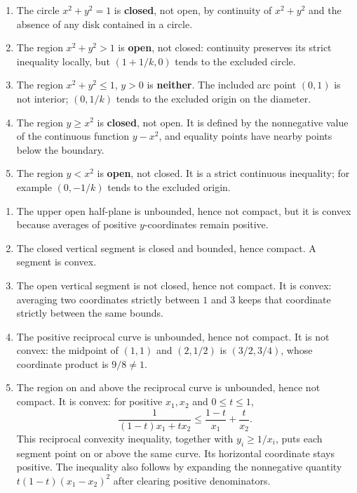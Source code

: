 \begin{enumerate}[label=(\alph*)]
\item The circle $x^2+y^2=1$ is \textbf{closed}, not open, by continuity
of $x^2+y^2$ and the absence of any disk contained in a circle.
\item The region $x^2+y^2>1$ is \textbf{open}, not closed: continuity
preserves its strict inequality locally, but $(1+1/k,0)$ tends to the excluded circle.
\item The region $x^2+y^2\le1$, $y>0$ is \textbf{neither}.
The included arc point $(0,1)$ is not interior; $(0,1/k)$ tends to the
excluded origin on the diameter.
\item The region $y\ge x^2$ is \textbf{closed}, not open. It is defined
by the nonnegative value of the continuous function $y-x^2$, and equality
points have nearby points below the boundary.
\item The region $y<x^2$ is \textbf{open}, not closed. It is a strict
continuous inequality; for example $(0,-1/k)$ tends to the excluded origin.
\end{enumerate}

\begin{enumerate}[label=(\alph*)]
\item The upper open half-plane is unbounded, hence not compact, but
it is convex because averages of positive $y$-coordinates remain positive.
\item The closed vertical segment is closed and bounded, hence compact.
A segment is convex.
\item The open vertical segment is not closed, hence not compact. It
is convex: averaging two coordinates strictly between $1$ and $3$ keeps
that coordinate strictly between the same bounds.
\item The positive reciprocal curve is unbounded, hence not compact.
It is not convex: the midpoint of $(1,1)$ and $(2,1/2)$ is $(3/2,3/4)$,
whose coordinate product is $9/8\ne1$.
\item The region on and above the reciprocal curve is unbounded, hence
not compact. It is convex: for positive $x_1,x_2$ and $0\le t\le1$,
\[
 \frac1{(1-t)x_1+tx_2}\le\frac{1-t}{x_1}+\frac{t}{x_2}.
\]
This reciprocal convexity inequality, together with $y_i\ge1/x_i$,
puts each segment point on or above the same curve. Its horizontal coordinate
stays positive. The inequality also follows by expanding the nonnegative
quantity $t(1-t)(x_1-x_2)^2$ after clearing positive denominators.
\end{enumerate}

